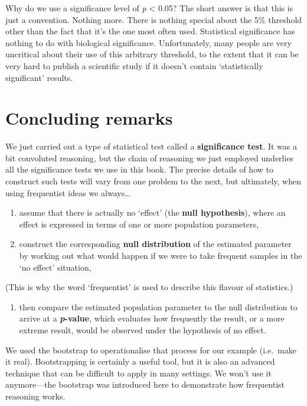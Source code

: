 \documentclass[
]{book}
\providecommand{\tightlist}{%
  \setlength{\itemsep}{0pt}\setlength{\parskip}{0pt}}
\begin{document}
Why do we use a significance level of \emph{p} \textless{} 0.05? The short answer is that this is just a convention. Nothing more. There is nothing special about the 5\% threshold other than the fact that it's the one most often used. Statistical significance has nothing to do with biological significance. Unfortunately, many people are very uncritical about their use of this arbitrary threshold, to the extent that it can be very hard to publish a scientific study if it doesn't contain `statistically significant' results.

\hypertarget{concluding-remarks}{%
\section{Concluding remarks}\label{concluding-remarks}}

We just carried out a type of statistical test called a \textbf{significance test}. It was a bit convoluted reasoning, but the chain of reasoning we just employed underlies all the significance tests we use in this book. The precise details of how to construct such tests will vary from one problem to the next, but ultimately, when using frequentist ideas we always\ldots{}

\begin{enumerate}
\def\labelenumi{\arabic{enumi}.}
\item
  assume that there is actually no `effect' (the \textbf{null hypothesis}), where an effect is expressed in terms of one or more population parameters,
\item
  construct the corresponding \textbf{null distribution} of the estimated parameter by working out what would happen if we were to take frequent samples in the `no effect' situation,
\end{enumerate}

(This is why the word `frequentist' is used to describe this flavour of statistics.)

\begin{enumerate}
\def\labelenumi{\arabic{enumi}.}
\setcounter{enumi}{2}
\tightlist
\item
  then compare the estimated population parameter to the null distribution to arrive at a \textbf{\emph{p}-value}, which evaluates how frequently the result, or a more extreme result, would be observed under the hypothesis of no effect.
\end{enumerate}

We used the bootstrap to operationalise that process for our example (i.e.~make it real). Bootstrapping is certainly a useful tool, but it is also an advanced technique that can be difficult to apply in many settings. We won't use it anymore---the bootstrap was introduced here to demonstrate how frequentist reasoning works.
\end{document}
